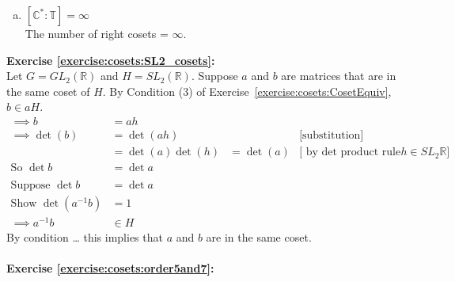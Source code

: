 \begin{enumerate}[(a)]
\item
$[ {\mathbb C}^\ast : {\mathbb T} ] = \infty$
\\
The number of right cosets = $\infty$.

\end{enumerate}

\noindent\textbf{Exercise \ref{exercise:cosets:SL2_cosets}:}
\\
Let $G = GL_2({\mathbb R})$  and $H = SL_2({\mathbb R})$. Suppose $a$ and $b$ are matrices that are in the same coset of $H$.  By Condition (3) of Exercise~\ref{exercise:cosets:CosetEquiv}, $b \in aH$. 
\begin{align*}
\implies b &= ah
\\
\implies \det(b) &= \det(ah)  & &\text{[substitution]}
\\
&= \det(a)\det(h) &= \det(a)  &\text{[ by det product rule and\ } h \in SL_2{\mathbb R} ]
\\
\text{So\ } \det b &= \det a
\\
\\
\text{Suppose\ } \det b &= \det a
\\
\text{Show\ } \det(a^{-1} b) &= 1
\\
\implies a^{-1}b &\in H
\end{align*}
By condition … this implies that $a$ and $b$ are in the same coset.
\\
\\
\noindent\textbf{Exercise \ref{exercise:cosets:order5and7}:}
%
